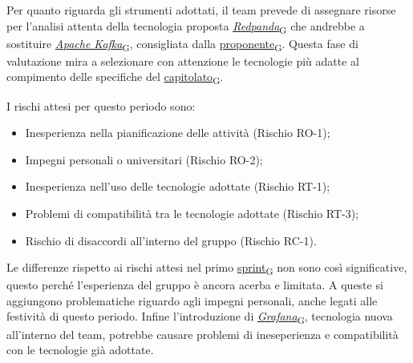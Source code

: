 Per quanto riguarda gli strumenti adottati, il team prevede di assegnare risorse per l'analisi attenta della tecnologia proposta \href{https://7last.github.io/docs/rtb/documentazione-interna/glossario\#redpanda}{\textit{Redpanda}\textsubscript{G}} che andrebbe a sostituire \href{https://7last.github.io/docs/rtb/documentazione-interna/glossario\#apache-kafka}{\textit{Apache Kafka}\textsubscript{G}}, consigliata dalla \href{https://7last.github.io/docs/rtb/documentazione-interna/glossario\#proponente}{proponente\textsubscript{G}}. Questa fase di valutazione mira a selezionare con attenzione le tecnologie più adatte al compimento delle specifiche del \href{https://7last.github.io/docs/rtb/documentazione-interna/glossario\#capitolato}{capitolato\textsubscript{G}}.

I rischi attesi per questo periodo sono:
\begin{itemize}
	\item Inesperienza nella pianificazione delle attività (Rischio RO-1);
	\item Impegni personali o universitari (Rischio RO-2);
	\item Inesperienza nell'uso delle tecnologie adottate (Rischio RT-1);
	\item Problemi di compatibilità tra le tecnologie adottate (Rischio RT-3);
	\item Rischio di disaccordi all'interno del gruppo (Rischio RC-1).
\end{itemize}
Le differenze rispetto ai rischi attesi nel primo \href{https://7last.github.io/docs/rtb/documentazione-interna/glossario\#sprint}{sprint\textsubscript{G}} non sono così significative, questo perché l'esperienza del gruppo è ancora acerba e limitata.
A queste si aggiungono problematiche riguardo agli impegni personali, anche legati alle festività di questo periodo. Infine l'introduzione di \href{https://7last.github.io/docs/rtb/documentazione-interna/glossario\#grafana}{\textit{Grafana}\textsubscript{G}},
tecnologia nuova all'interno del team, potrebbe causare problemi di ineseperienza e compatibilità con le tecnologie già adottate.

